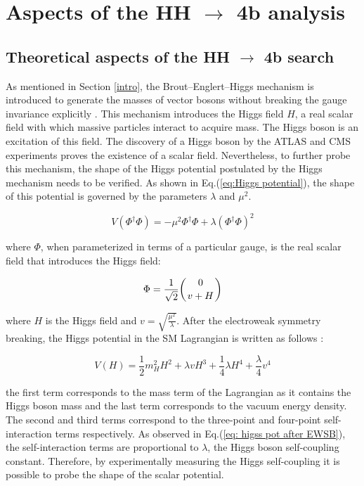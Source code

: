 \section{Aspects of the HH $\to$ 4b analysis} \label{section: HH4b}

\subsection{Theoretical aspects of the HH $\to$ 4b search}

As mentioned in Section \ref{intro}, the Brout–Englert–Higgs mechanism is introduced to generate the masses of vector bosons without breaking the gauge invariance explicitly \cite{Higgs64}. This mechanism introduces the Higgs field $H$, a real scalar field with which massive particles interact to acquire mass. The Higgs boson is an excitation of this field. The discovery of a Higgs boson by the ATLAS \cite{ATLASdecouvhiggs} and CMS\cite{CMShiggsdecouv} experiments proves the existence of a scalar field. Nevertheless, to further probe this mechanism, the shape of the Higgs potential postulated by the Higgs mechanism needs to be verified. As shown in Eq.(\ref{eq:Higgs potential}), the shape of this potential is governed by the parameters $\lambda$ and $\mu^2$.

\begin{equation}
    V(\Phi^\dag \Phi)=-\mu^2 \Phi^\dag \Phi + \lambda (\Phi^\dag \Phi)^2
    \label{eq:Higgs potential}
\end{equation}

\noindent where $\Phi$, when parameterized in terms of a particular gauge, is the real scalar field that introduces the Higgs field:

\begin{equation}
    \Phi= \frac{1}{\sqrt{2}}\bigg( {0 \atop v + H} \bigg)
\end{equation}

\noindent where $H$ is the Higgs field and $v=\sqrt{\frac{\mu^2}{\lambda}}$. After the electroweak symmetry breaking, the Higgs potential in the SM Lagrangian is written as follows \cite{higgs_potential}:

\begin{equation}
    V(H)= \frac{1}{2} m_H^2 H^2 + \lambda v H^3 +\frac{1}{4} \lambda H^4 + \frac{\lambda}{4} v^4
    \label{eq: higss pot after EWSB}
\end{equation}

\noindent the first term corresponds to the mass term of the Lagrangian as it contains the Higgs boson mass and the last term corresponds to the vacuum energy density. The second and third terms correspond to the three-point and four-point self-interaction terms respectively. As observed in Eq.(\ref{eq: higss pot after EWSB}), the self-interaction terms are proportional to $\lambda$, the Higgs boson self-coupling constant. Therefore, by experimentally measuring the Higgs self-coupling it is possible to probe the shape of the scalar potential.


